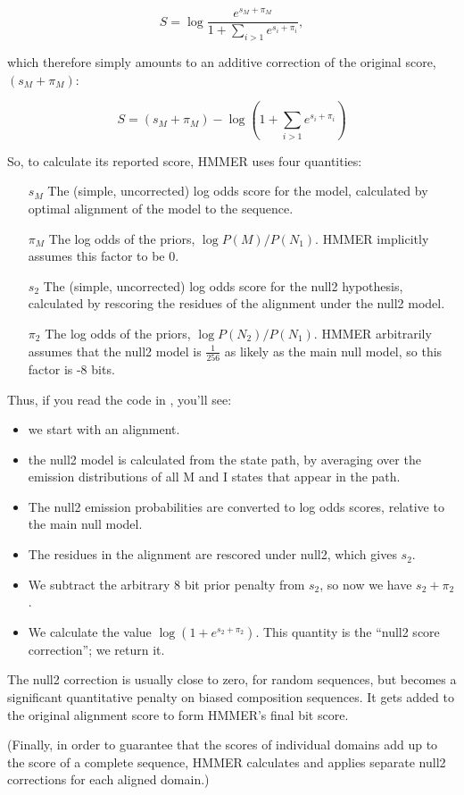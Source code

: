 \[
   S = \log  \frac{e^{s_M + \pi_M}} { 1 + \sum_{i>1} e^{s_i + \pi_i}},
\]

which therefore simply amounts to an additive correction of the
original score, $(s_M + \pi_M)$:

\[
  S = (s_M + \pi_M) - \log \left( 1 + \sum_{i>1} e^{s_i + \pi_i} \right)
\]

So, to calculate its reported score, HMMER uses four quantities:

\begin{enumerate}
\item [$s_M$] The (simple, uncorrected) log odds score for the model,
calculated by optimal alignment of the model to the sequence.

\item [$\pi_M$] The log odds of the priors, $\log P(M)/P(N_1)$. HMMER
   implicitly assumes this factor to be 0.

\item [$s_2$] The (simple, uncorrected) log odds score
   for the null2 hypothesis, calculated by rescoring the residues
   of the alignment under the null2 model.

\item [$\pi_2$] The log odds of the priors, $\log
P(N_2)/P(N_1)$. HMMER arbitrarily assumes that the null2 model is
$\frac{1}{256}$ as likely as the main null model, so this factor
is -8 bits.
\end{enumerate}

Thus, if you read the code in ,
you'll see:
\begin{itemize}
\item we start with an alignment.
\item the null2 model is calculated from the state path, by
      averaging over the emission distributions of all M and I 
      states that appear in the path.
\item The null2 emission probabilities are converted to 
      log odds scores, relative to the main null model.
\item The residues in the alignment are rescored under null2,
      which gives $s_2$.
\item We subtract the arbitrary 8 bit prior penalty from $s_2$,
      so now we have $s_2 + \pi_2$.
\item We calculate the value
      $\log (1 + e^{s_2 + \pi_2})$.
      This quantity is the ``null2 score correction''; we return it. 
\end{itemize}

The null2 correction is usually close to zero, for random sequences,
but becomes a significant quantitative penalty on biased composition
sequences.  It gets added to the original alignment score to form
HMMER's final bit score.

(Finally, in order to guarantee that the scores of individual domains
add up to the score of a complete sequence, HMMER calculates and
applies separate null2 corrections for each aligned domain.)





